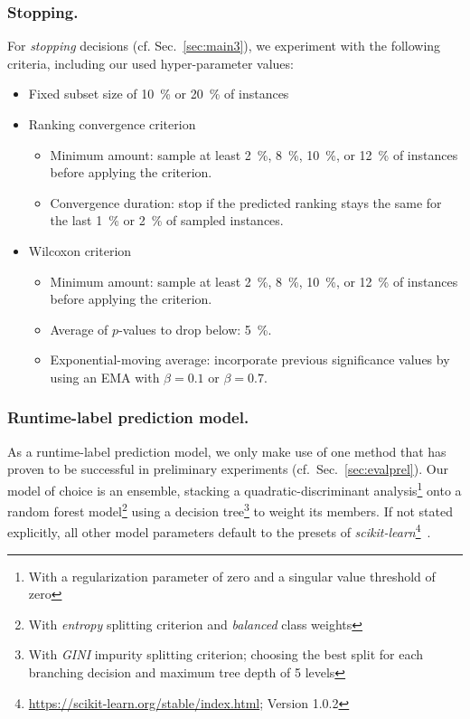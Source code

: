 \documentclass[runningheads]{llncs}
\begin{document}
\subsubsection{Stopping.}
For \textit{stopping} decisions (cf. Sec.~\ref{sec:main3}), we experiment with the following criteria, including our used hyper-parameter values:
\begin{itemize}
  \item Fixed subset size of \SI{10}{\%} or \SI{20}{\%} of instances
  \item Ranking convergence criterion
  \begin{itemize}
    \item Minimum amount: sample at least \SI{2}{\%}, \SI{8}{\%}, \SI{10}{\%}, or \SI{12}{\%} of instances before applying the criterion.
    \item Convergence duration: stop if the predicted ranking stays the same for the last \SI{1}{\%} or \SI{2}{\%} of sampled instances.
  \end{itemize}

  \item Wilcoxon criterion
  \begin{itemize}
    \item Minimum amount: sample at least \SI{2}{\%}, \SI{8}{\%}, \SI{10}{\%}, or \SI{12}{\%} of instances before applying the criterion.
    \item Average of $p$-values to drop below: \SI{5}{\%}.
    \item Exponential-moving average: incorporate previous significance values by using an EMA with $\beta = 0.1$ or $\beta = 0.7$.
  \end{itemize}
\end{itemize}

\subsubsection{Runtime-label prediction model.}
As a runtime-label prediction model, we only make use of one method that has proven to be successful in preliminary experiments (cf.~Sec.~\ref{sec:evalprel}).
Our model of choice is an ensemble, stacking a quadratic-discriminant analysis\footnote{With a regularization parameter of zero and a singular value threshold of zero} onto a random forest model\footnote{With \textit{entropy} splitting criterion and \textit{balanced} class weights} using a decision tree\footnote{With \textit{GINI} impurity splitting criterion; choosing the best split for each branching decision and maximum tree depth of 5 levels} to weight its members.
If not stated explicitly, all other model parameters default to the presets of \textit{scikit-learn}\footnote{\url{https://scikit-learn.org/stable/index.html}; Version 1.0.2}~\cite{scikit-learn}.
\end{document}
